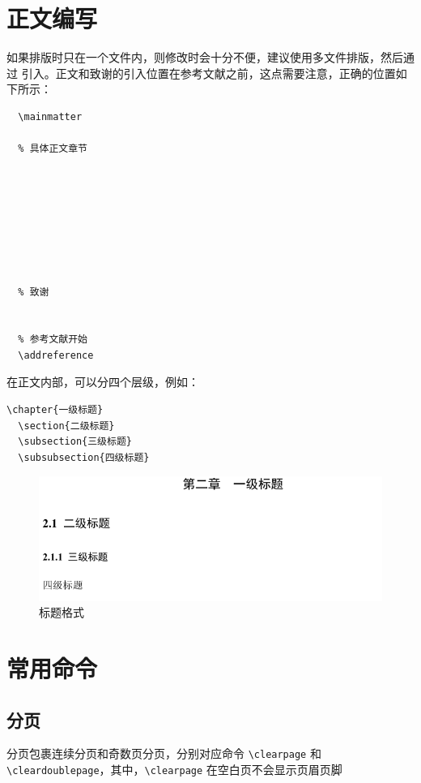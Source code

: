 \section{正文编写}
如果排版时只在一个文件内，则修改时会十分不便，建议使用多文件排版，然后通过 \verb|| 引入。正文和致谢的引入位置在参考文献之前，这点需要注意，正确的位置如下所示：
\begin{lstlisting}[caption=正文引入]
  % 正文开始
  \mainmatter
  
  % 具体正文章节
  
  
  
  
  
  
  
  
  % 致谢
  
  
  % 参考文献开始
  \addreference
\end{lstlisting}
在正文内部，可以分四个层级，例如：
\begin{lstlisting}[caption=章节命令使用]
  \chapter{一级标题}
  \section{二级标题}
  \subsection{三级标题}
  \subsubsection{四级标题}
\end{lstlisting}
\begin{figure}[H]
  \centering 
  \includegraphics[width=0.5 \linewidth]{figures/2-1}
  \caption{标题格式}
  \label{2:1}
\end{figure}
\section{常用命令}
\subsection{分页}
分页包裹连续分页和奇数页分页，分别对应命令 \verb|\clearpage| 和 \verb|\cleardoublepage|，其中，\verb|\clearpage| 在空白页不会显示页眉页脚
